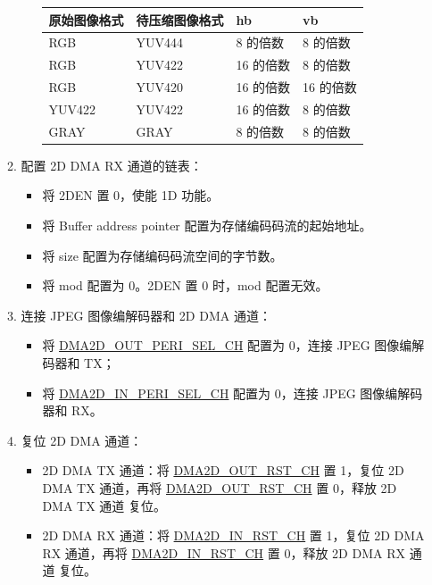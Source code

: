 \documentclass[main\_\_CN.tex]{subfiles}
\begin{document}
\begin{enumerate}
\begin{enumerate}
\begin{itemize}
\begin{longtable}{ | L{4cm} | L{4cm} | l | l |}
        \\ \hline
        \textbf{原始图像格式} & \textbf{待压缩图像格式}  &  \textbf{hb}  &  \textbf{vb}\\ \hline
        RGB  &  YUV444 &  8 的倍数 &  8 的倍数  \\ \hline
        RGB  &  YUV422 &  16 的倍数 &  8 的倍数  \\ \hline
        RGB  &  YUV420 &  16 的倍数 &  16 的倍数  \\ \hline
        YUV422  &  YUV422 &  16 的倍数 &  8 的倍数  \\ \hline
        GRAY  &  GRAY &  8 的倍数 &  8 的倍数  \\ \hline
        \end{longtable}
        \end{itemize}
        \item 配置 2D DMA RX 通道的链表：
        \begin{itemize}
            \item 将 2DEN 置 0，使能 1D 功能。
            \item 将 Buffer address pointer 配置为存储编码码流的起始地址。
            \item 将 size 配置为存储编码码流空间的字节数。
            \item 将 mod 配置为 0。2DEN 置 0 时，mod 配置无效。
        \end{itemize}
        \item 连接 JPEG 图像编解码器和 2D DMA 通道：
        \begin{itemize}
            \item 将 \hyperref[fielddesc:DMA2DOUTPERISELCHN]{DMA2D\_OUT\_PERI\_SEL\_CH} 配置为 0，连接 JPEG 图像编解码器和 TX；
            \item 将 \hyperref[fielddesc:DMA2DINPERISELCHN]{DMA2D\_IN\_PERI\_SEL\_CH} 配置为 0，连接 JPEG 图像编解码器和 RX。
        \end{itemize}
        \item 复位 2D DMA 通道：
        \begin{itemize}
            \item 2D DMA TX 通道：将 \hyperref[fielddesc:DMA2DOUTRSTCHN]{DMA2D\_OUT\_RST\_CH} 置 1，复位 2D DMA TX 通道，再将 \hyperref[fielddesc:DMA2DOUTRSTCHN]{DMA2D\_OUT\_RST\_CH} 置 0，释放 2D DMA TX 通道 复位。
            \item 2D DMA RX 通道：将 \hyperref[fielddesc:DMA2DINRSTCHN]{DMA2D\_IN\_RST\_CH} 置 1，复位 2D DMA RX 通道，再将 \hyperref[fielddesc:DMA2DINRSTCHN]{DMA2D\_IN\_RST\_CH} 置 0，释放 2D DMA RX 通道 复位。

\end{itemize}
\end{enumerate}
\end{enumerate}
\end{document}
